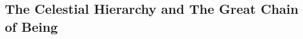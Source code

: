 \documentclass[10pt,letterpaper]{article}
\begin{document}



\subsection*{The Celestial Hierarchy and The Great Chain of Being}
\end{document}
